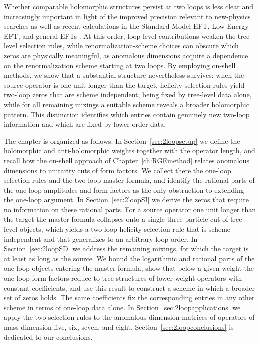 Whether comparable holomorphic structures persist at two loops is less clear and increasingly important in light of
the improved precision relevant to new-physics searches 
\cite{Allwicher:2023aql,Stefanek:2024kds,Haisch:2024wnw,Olgoso:2025jot,Mantani:2026fao,Born:2026tgm}
as well as
recent calculations in the Standard Model EFT, Low-Energy EFT, and general EFTs
\cite{Born:2026xkr,Ibarra:2024tpt,Zhang:2025ywe,DiNoi:2025tka,Aebischer:2022anv,Born:2024mgz,DiNoi:2024ajj,Duhr:2025zqw,DiNoi:2025arz,Haisch:2025lvd,Haisch:2025vqj,Duhr:2025yor,Banik:2025wpi,Naterop:2024cfx,Naterop:2025lzc,Naterop:2025cwg,Aebischer:2025hsx,Jenkins:2023bls,EliasMiro:2021jgu,Guedes:2025sax,Aebischer:2026zxv,Fonseca:2025zjb,Fonseca:2025cls,Misiak:2025xzq,Aebischer:2025zxg,Aebischer:2025ddl,Henriksson:2025hwi,Henriksson:2025vyi}.
%
At this order, loop-level contributions weaken the tree-level selection rules, while renormalization-scheme choices can obscure which zeros are physically meaningful, as anomalous dimensions acquire a dependence on the renormalization scheme starting at two loops. 
%
By employing on-shell methods,
we show that a substantial structure nevertheless survives: when the source operator is one unit longer than the target, helicity selection rules yield two-loop zeros that are scheme independent, being fixed by tree-level data alone, while for all remaining mixings a suitable scheme reveals a broader holomorphic pattern.
This distinction identifies which entries contain genuinely new two-loop information and which are fixed by lower-order data.

The chapter is organized as follows. In Section~\ref{sec:2loopsetup} we define the holomorphic and anti-holomorphic weights together with the operator length,
and recall how the on-shell approach of Chapter~\ref{ch:RGEmethod} relates anomalous dimensions to
unitarity cuts of form factors. We collect there the one-loop selection rules and the two-loop master
formula, and identify the rational parts of the one-loop amplitudes and form factors as the only
obstruction to extending the one-loop argument. In Section~\ref{sec:2loopSI} we derive the zeros that
require no information on these rational parts. For a source operator one unit longer than the target
the master formula collapses onto a single three-particle cut of tree-level objects, which yields a
two-loop helicity selection rule that is scheme independent and that generalizes to an arbitrary loop
order. In Section~\ref{sec:2loopSD} we address the remaining mixings, for which the target is at least
as long as the source. We bound the logarithmic and rational parts of the one-loop objects entering
the master formula, show that below a given weight the one-loop form factors reduce to tree structures
of lower-weight operators with constant coefficients, and use this result to construct a scheme in
which a broader set of zeros holds. The same coefficients fix the corresponding entries in any other
scheme in terms of one-loop data alone. In Section~\ref{sec:2loopapplications} we apply the two
selection rules to the anomalous-dimension matrices of operators of mass dimension five, six, seven,
and eight. Section~\ref{sec:2loopconclusions} is dedicated to our conclusions.

